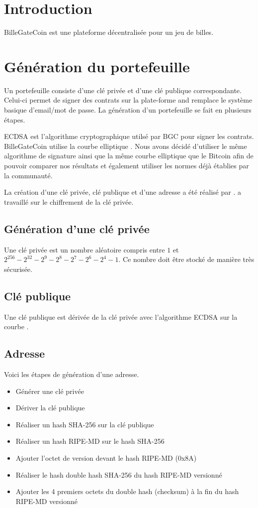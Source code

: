 \documentclass{article}
\begin{document}
\section{Introduction}
BilleGateCoin est une plateforme décentralisée pour un jeu de billes.

\section{Génération du portefeuille}
Un portefeuille consiste d'une clé privée et d'une clé publique correspondante. Celui-ci permet de signer des contrats sur la plate-forme and remplace le système basique d'email/mot de passe.
La génération d'un portefeuille se fait en plusieurs étapes.

ECDSA est l'algorithme cryptographique utilsé par BGC pour signer les contrats.
BilleGateCoin utilise la courbe elliptique . Nous avons décidé d'utiliser le même algorithme de signature ainsi que la même courbe elliptique que le Bitcoin afin de pouvoir comparer nos résultats et également utiliser les normes déjà établies par la communauté.

La création d'une clé privée, clé publique et d'une adresse a été réalisé par .
 a travaillé sur le chiffrement de la clé privée.

\subsection{Génération d'une clé privée}

Une clé privée est un nombre aléatoire compris entre $1$ et $2^{256} - 2^{32} - 2^{9} - 2^{8} - 2^{7} - 2^{6} - 2^{4} - 1$. Ce nombre doit être stocké de manière très sécurisée.

\subsection{Clé publique}
Une clé publique est dérivée de la clé privée avec l'algorithme ECDSA sur la courbe .

\subsection{Adresse}
Voici les étapes de génération d'une adresse.

\begin{itemize}
    \item Générer une clé privée
    \item Dériver la clé publique
    \item Réaliser un hash SHA-256 sur la clé publique
    \item Réaliser un hash RIPE-MD sur le hash SHA-256
    \item Ajouter l'octet de version devant le hash RIPE-MD (0x8A)
    \item Réaliser le hash double hash SHA-256 du hash RIPE-MD versionné
    \item Ajouter les 4 premiers octets du double hash (checksum) à la fin du hash RIPE-MD versionné
\end{itemize}
\end{document}
